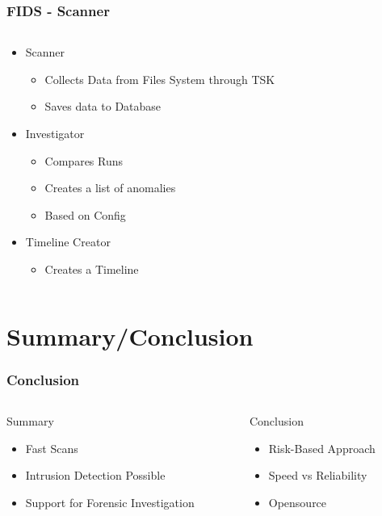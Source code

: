 \documentclass{beamer}
\begin{document}
\begin{frame}[fragile]
  \frametitle{FIDS - Scanner}
  \begin{columns}
    \begin{column}{1\textwidth}
      \begin{itemize}
        \item Scanner
        \begin{itemize}
          \item Collects Data from Files System through TSK
          \item Saves data to Database
        \end{itemize}
        \pause
        \item Investigator
        \begin{itemize}
          \item Compares Runs
          \item Creates a list of anomalies
          \item Based on Config
        \end{itemize}
        \pause
        \item Timeline Creator
        \begin{itemize}
          \item Creates a Timeline
        \end{itemize}
      \end{itemize}
    \end{column}
  \end{columns}
\end{frame}

\section{Summary/Conclusion}

\begin{frame}[fragile]
  \frametitle{Conclusion}
  \begin{columns}
    \begin{column}{0.5\textwidth}
      Summary
      \begin{itemize}
          \item Fast Scans
          \item Intrusion Detection Possible
          \item Support for Forensic Investigation
      \end{itemize}
    \end{column}
    \pause
    \begin{column}{0.5\textwidth}
      Conclusion
      \begin{itemize}
        \item Risk-Based Approach
        \item Speed vs Reliability
        \item Opensource
      \end{itemize}
    \end{column}
  \end{columns}
\end{frame}
\end{document}

